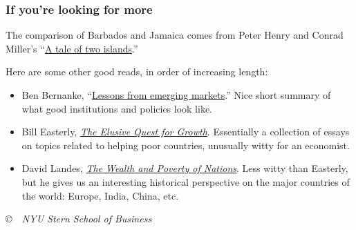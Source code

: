 \documentclass[letterpaper,12pt]{article}
\begin{document}
\subsubsection*{If you're looking for more}

The comparison of Barbados and Jamaica comes from Peter Henry and Conrad Miller's
``\href{http://web-docs.stern.nyu.edu/old_web/aboutstern/publications/Tale_of_Two_Islands-AER.pdf}
{A tale of two islands}.''

Here are some other good reads, in order of increasing length:
\begin{itemize}
\item Ben Bernanke,
``\href{http://www.federalreserve.gov/newsevents/speech/bernanke20110928a.htm}
{Lessons from emerging markets}.''
Nice short summary of what good institutions and policies look like.

\item Bill Easterly,
\href{http://www.amazon.com/Elusive-Quest-Growth-Economists-Misadventures/dp/0262550423}
{\it The Elusive Quest for Growth}.
Essentially a collection of essays on topics related to helping poor countries,
unusually witty for an economist.

\item David Landes,
\href{http://www.amazon.com/Wealth-Poverty-Nations-Some-Rich/dp/0393318885}
{\it The Wealth and Poverty of Nations}.
Less witty than Easterly, but he gives us an interesting historical
perspective on the major countries of the world:  Europe, India, China, etc.
\end{itemize}


\vfill \centerline{\it \copyright \  \number\year \  NYU Stern
School of Business}
\end{document}
